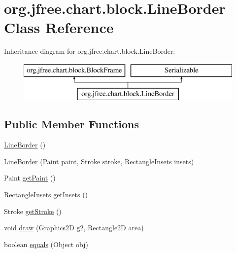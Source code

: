 \hypertarget{classorg_1_1jfree_1_1chart_1_1block_1_1_line_border}{}\section{org.\+jfree.\+chart.\+block.\+Line\+Border Class Reference}
\label{classorg_1_1jfree_1_1chart_1_1block_1_1_line_border}
Inheritance diagram for org.\+jfree.\+chart.\+block.\+Line\+Border\+:\begin{figure}[H]
\begin{center}
\leavevmode
\includegraphics[height=2.000000cm]{classorg_1_1jfree_1_1chart_1_1block_1_1_line_border}
\end{center}
\end{figure}
\subsection*{Public Member Functions}
\begin{DoxyCompactItemize}
\item 
\mbox{\hyperlink{classorg_1_1jfree_1_1chart_1_1block_1_1_line_border_a4b49d18caa0980cb28da707e1f92a175}{Line\+Border}} ()
\item 
\mbox{\hyperlink{classorg_1_1jfree_1_1chart_1_1block_1_1_line_border_a13f0986387312feba403954c305f07ca}{Line\+Border}} (Paint paint, Stroke stroke, Rectangle\+Insets insets)
\item 
Paint \mbox{\hyperlink{classorg_1_1jfree_1_1chart_1_1block_1_1_line_border_ae3527e582df30cc180cd066d71787d57}{get\+Paint}} ()
\item 
Rectangle\+Insets \mbox{\hyperlink{classorg_1_1jfree_1_1chart_1_1block_1_1_line_border_a9487885ccbfa1805c3912fafd6e27d5e}{get\+Insets}} ()
\item 
Stroke \mbox{\hyperlink{classorg_1_1jfree_1_1chart_1_1block_1_1_line_border_acaf4b7558fe9757dca4047f8c554408f}{get\+Stroke}} ()
\item 
void \mbox{\hyperlink{classorg_1_1jfree_1_1chart_1_1block_1_1_line_border_aabedc62e5a7d7b03629c6406a8e7541e}{draw}} (Graphics2D g2, Rectangle2D area)
\item 
boolean \mbox{\hyperlink{classorg_1_1jfree_1_1chart_1_1block_1_1_line_border_a8a85f237d8099f6141229a6466f38037}{equals}} (Object obj)
\end{DoxyCompactItemize}


